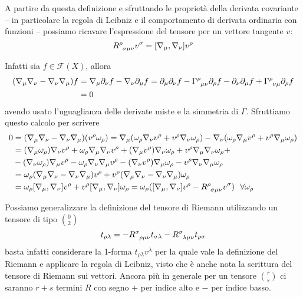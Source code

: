 A partire da questa definizione e sfruttando le proprietà della derivata covariante -- in particolare la regola di Leibniz e il comportamento di derivata ordinaria con funzioni -- possiamo ricavare l'espressione del tensore per un vettore tangente $v$:
\begin{equation*}
    \tensor{R}{^\rho_{\sigma\mu\nu}}v^\sigma = [\nabla_\mu, \nabla_\nu]v^\rho
\end{equation*}

Infatti sia $f\in \mathcal{F}(X)$, allora
\begin{align*}
    (\nabla_\mu \nabla_\nu - \nabla_\nu \nabla_\mu) f &= 
        \nabla_\mu \partial_\nu f - \nabla_\nu\partial_\mu f = \partial_\mu\partial_\nu f -\tensor{\Gamma}{^\rho_{\mu\nu}}\partial_\rho f - \partial_\nu\partial_\mu f + \tensor{\Gamma}{^\rho_{\nu\mu}} \partial_\rho f \\
        &=0
\end{align*}
avendo usato l'uguaglianza delle derivate miste e la simmetria di $\Gamma$. Sfruttiamo questo calcolo per scrivere
\begin{align*}
    0 &= (\nabla_\mu \nabla_\nu - \nabla_\nu \nabla_\mu)(v^\rho\omega_\rho) = \nabla_\mu (\omega_\rho \nabla_\nu v^\rho + v^\rho\nabla_\nu \omega_\rho) - \nabla_\nu( \omega_\rho \nabla_\mu v^\rho + v^\rho\nabla_\mu \omega_\rho) \\
    &= (\nabla_\mu\omega_\rho)\nabla_\nu v^\rho + \omega_\rho\nabla_\mu\nabla_\nu v^\rho + (\nabla_\mu v^\rho)\nabla_\nu \omega_\rho + v^\rho \nabla_\mu\nabla_\nu \omega_\rho + \\
    &- (\nabla_\nu \omega_\rho)\nabla_\mu v^\rho - \omega_\rho\nabla_\nu\nabla_\mu v^\rho - (\nabla_\nu v^\rho)\nabla_\mu\omega_\rho - v^\rho \nabla_\nu\nabla_\mu\omega_\rho\\
    &=\omega_\rho( \nabla_\mu \nabla_\nu - \nabla_\nu \nabla_\mu)v^\rho + v^\rho(\nabla_\mu \nabla_\nu - \nabla_\nu \nabla_\mu)\omega_\rho  \\
    &= \omega_\rho[\nabla_\mu,\nabla_\nu]v^\rho + v^\rho[\nabla_\mu,\nabla_\nu]\omega_\rho = \omega_\rho( [\nabla_\mu,\nabla_\nu]v^\rho - \tensor{R}{^\rho_{\sigma\mu\nu}}v^\sigma) \ \ \forall \omega_\rho
\end{align*}

Possiamo generalizzare la definizione del tensore di Riemann utilizzando un tensore di tipo $\binom{0}{2}$
\begin{equation}
    [\nabla_\mu, \nabla_\nu] t_{\rho\lambda} = -    \tensor{R}{^\sigma_{\rho\mu\nu}} t_{\sigma\lambda} -     \tensor{R}{^\sigma_{\lambda\mu\nu}} t_{\rho\sigma}
    \label{eq.riemann_generaliz}
\end{equation}
basta infatti considerare la 1-forma $t_{\rho\lambda}v^\lambda$ per la quale vale la definizione del Riemann e applicare la regola di Leibniz, visto che è anche nota la scrittura del tensore di Riemann sui vettori.
Ancora più in generale per un tensore $\binom{r}{s}$ ci saranno $r+s$ termini $R$ con segno $+$ per indice alto e $-$ per indice  basso.

